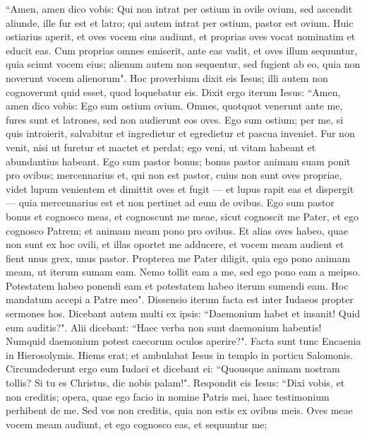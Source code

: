 \begin{biblechapter} 
\verse “Amen, amen dico vobis: Qui non intrat per ostium in ovile ovium, sed ascendit aliunde, ille fur est et latro; 
\verse qui autem intrat per ostium, pastor est ovium. 
\verse Huic ostiarius aperit, et oves vocem eius audiunt, et proprias oves vocat nominatim et educit eas. 
\verse Cum proprias omnes emiserit, ante eas vadit, et oves illum sequuntur, quia sciunt vocem eius; 
\verse alienum autem non sequentur, sed fugient ab eo, quia non noverunt vocem alienorum". 
\verse Hoc proverbium dixit eis Iesus; illi autem non cognoverunt quid esset, quod loquebatur eis. 
\verse Dixit ergo iterum Iesus: “Amen, amen dico vobis: Ego sum ostium ovium. 
\verse Omnes, quotquot venerunt ante me, fures sunt et latrones, sed non audierunt eos oves. 
\verse Ego sum ostium; per me, si quis introierit, salvabitur et ingredietur et egredietur et pascua inveniet. 
\verse Fur non venit, nisi ut furetur et mactet et perdat; ego veni, ut vitam habeant et abundantius habeant.  
\verse Ego sum pastor bonus; bonus pastor animam suam ponit pro ovibus; 
\verse mercennarius et, qui non est pastor, cuius non sunt oves propriae, videt lupum venientem et dimittit oves et fugit — et lupus rapit eas et dispergit — 
\verse quia mercennarius est et non pertinet ad eum de ovibus. 
\verse Ego sum pastor bonus et cognosco meas, et cognoscunt me meae, 
\verse sicut cognoscit me Pater, et ego cognosco Patrem; et animam meam pono pro ovibus. 
\verse Et alias oves habeo, quae non sunt ex hoc ovili, et illas oportet me adducere, et vocem meam audient et fient unus grex, unus pastor. 
\verse Propterea me Pater diligit, quia ego pono animam meam, ut iterum sumam eam. 
\verse Nemo tollit eam a me, sed ego pono eam a meipso. Potestatem habeo ponendi eam et potestatem habeo iterum sumendi eam. Hoc mandatum accepi a Patre meo". 
\verse Dissensio iterum facta est inter Iudaeos propter sermones hos. 
\verse Dicebant autem multi ex ipsis: “Daemonium habet et insanit! Quid eum auditis?". 
\verse Alii dicebant: “Haec verba non sunt daemonium habentis! Numquid daemonium potest caecorum oculos aperire?". 
\verse Facta sunt tunc Encaenia in Hierosolymis. Hiems erat; 
\verse et ambulabat Iesus in templo in porticu Salomonis. 
\verse Circumdederunt ergo eum Iudaei et dicebant ei: “Quousque animam nostram tollis? Si tu es Christus, dic nobis palam!". 
\verse Respondit eis Iesus: “Dixi vobis, et non creditis; opera, quae ego facio in nomine Patris mei, haec testimonium perhibent de me. 
\verse Sed vos non creditis, quia non estis ex ovibus meis. 
\verse Oves meae vocem meam audiunt, et ego cognosco eas, et sequuntur me; 

\end{biblechapter}

